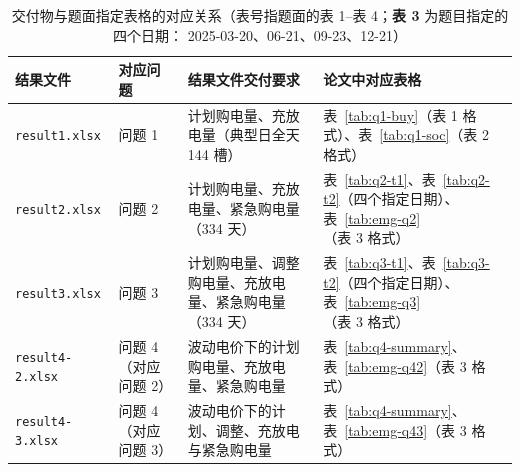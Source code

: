 \begin{table}[htbp]
  \centering
  \caption{交付物与题面指定表格的对应关系（表号指题面的表 1--表 4；\textbf{表 3} 为题目指定的四个日期：
            2025-03-20、06-21、09-23、12-21）}
  \label{tab:deliverable}
  \footnotesize
  \setlength{\tabcolsep}{4pt}
  \begin{tabularx}{\linewidth}{C{2.05cm} C{1.55cm} L{2.55cm} Y}
    \toprule
    结果文件 & 对应问题 & 结果文件交付要求 & 论文中对应表格 \\
    \midrule
    \texttt{result1.xlsx} & 问题 1 & 计划购电量、充放电量（典型日全天 144 槽）
      & 表~\ref{tab:q1-buy}（表 1 格式）、表~\ref{tab:q1-soc}（表 2 格式） \\
    \texttt{result2.xlsx} & 问题 2 & 计划购电量、充放电量、紧急购电量（334 天）
      & 表~\ref{tab:q2-t1}、表~\ref{tab:q2-t2}（四个指定日期）、表~\ref{tab:emg-q2}（表 3 格式） \\
    \texttt{result3.xlsx} & 问题 3 & 计划购电量、调整购电量、充放电量、紧急购电量（334 天）
      & 表~\ref{tab:q3-t1}、表~\ref{tab:q3-t2}（四个指定日期）、表~\ref{tab:emg-q3}（表 3 格式） \\
    \texttt{result4-2.xlsx} & 问题 4（对应问题 2） & 波动电价下的计划购电量、充放电量、紧急购电量
      & 表~\ref{tab:q4-summary}、表~\ref{tab:emg-q42}（表 3 格式） \\
    \texttt{result4-3.xlsx} & 问题 4（对应问题 3） & 波动电价下的计划、调整、充放电与紧急购电量
      & 表~\ref{tab:q4-summary}、表~\ref{tab:emg-q43}（表 3 格式） \\
    \bottomrule
  \end{tabularx}
\end{table}
